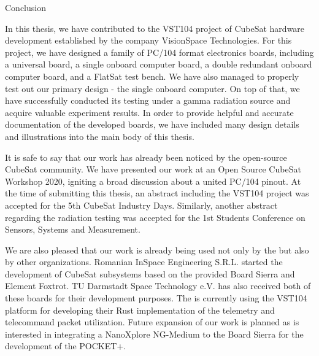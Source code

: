 

\chap Conclusion

\quad In this thesis, we have contributed to the VST104 project of CubeSat hardware development established by the company VisionSpace Technologies. For this project, we have designed a family of PC/104 format electronics boards, including a universal board, a single onboard computer board, a double redundant onboard computer board, and a FlatSat test bench. We have also managed to properly test out our primary design - the single onboard computer. On top of that, we have successfully conducted its testing under a gamma radiation source and acquire valuable experiment results. In order to provide helpful and accurate documentation of the developed boards, we have included many design details and illustrations into the main body of this thesis.

It is safe to say that our work has already been noticed by the open-source CubeSat community. We have presented our work at an Open Source CubeSat Workshop 2020, igniting a broad discussion about a united PC/104 pinout. At the time of submitting this thesis, an abstract including the VST104 project was accepted for the 5th  CubeSat Industry Days. Similarly, another abstract regarding the radiation testing was accepted for the 1st Students Conference on Sensors, Systems and Measurement.

We are also pleased that our work is already being used not only by the  but also by other organizations. Romanian InSpace Engineering S.R.L. started the development of CubeSat subsystems based on the provided Board Sierra and Element Foxtrot. TU Darmstadt Space Technology e.V. has also received both of these boards for their development purposes. The  is currently using the VST104 platform for developing their Rust implementation of the telemetry and telecommand packet utilization. Future expansion of our work is planned as  is interested in integrating a NanoXplore NG-Medium  to the Board Sierra for the development of the POCKET+.
